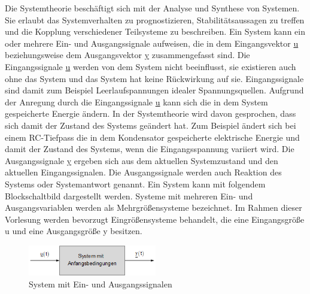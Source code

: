Die Systemtheorie beschäftigt sich mit der Analyse und Synthese von Systemen. Sie erlaubt das Systemverhalten zu prognostizieren, Stabilitätsaussagen zu treffen und die Kopplung verschiedener Teilsysteme zu beschreiben. \newline
Ein System kann ein oder mehrere Ein- und Ausgangssignale aufweisen, die in dem Eingangsvektor \underline{u}
beziehungsweise dem Ausgangsvektor \underline{y} zusammengefasst sind. Die Eingangssignale \underline{u} werden von dem System nicht beeinflusst, sie existieren auch ohne das System und das System hat keine Rückwirkung auf sie. Eingangssignale sind damit zum Beispiel Leerlaufspannungen idealer Spannungsquellen.
Aufgrund der Anregung durch die Eingangssignale \underline{u} kann sich die in dem System gespeicherte Energie ändern. In der Systemtheorie wird davon gesprochen, dass sich damit der Zustand des Systems geändert hat. Zum Beispiel ändert sich bei einem RC-Tiefpass die in dem Kondensator gespeicherte elektrische Energie und damit der Zustand des Systems, wenn die Eingangsspannung variiert wird. Die Ausgangssignale \underline{y} ergeben sich aus dem aktuellen Systemzustand und den aktuellen Eingangssignalen.
Die Ausgangssignale werden auch Reaktion des Systems oder Systemantwort genannt.\newline
Ein System kann mit folgendem Blockschaltbild dargestellt werden. Systeme mit mehreren Ein- und
Ausgangsvariablen werden als Mehrgrößensysteme bezeichnet. Im Rahmen dieser Vorlesung werden
bevorzugt Eingrößensysteme behandelt, die eine Eingangsgröße u und eine Ausgangsgröße y besitzen.

\begin{figure}[ht]
  \centerline{\includegraphics[width=0.5\textwidth]{Kapitel2/Bilder/image1}}
  \caption{System mit Ein- und Ausgangssignalen}
  \label{fig:EinAusSig}
\end{figure}


